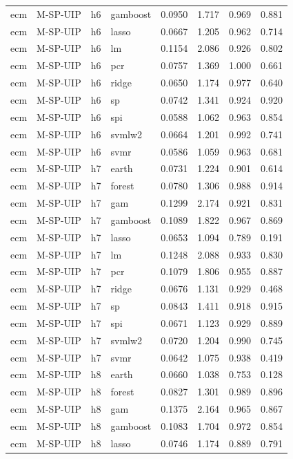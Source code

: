 \begin{ThreePartTable}
\begin{longtable}[t]{llclcccc}
ecm & M-SP-UIP & h6 & gamboost & 0.0950 & 1.717 & 0.969 & 0.881\\
ecm & M-SP-UIP & h6 & lasso & 0.0667 & 1.205 & 0.962 & 0.714\\
ecm & M-SP-UIP & h6 & lm & 0.1154 & 2.086 & 0.926 & 0.802\\
ecm & M-SP-UIP & h6 & pcr & 0.0757 & 1.369 & 1.000 & 0.661\\
ecm & M-SP-UIP & h6 & ridge & 0.0650 & 1.174 & 0.977 & 0.640\\
ecm & M-SP-UIP & h6 & sp & 0.0742 & 1.341 & 0.924 & 0.920\\
ecm & M-SP-UIP & h6 & spi & 0.0588 & 1.062 & 0.963 & 0.854\\
ecm & M-SP-UIP & h6 & svmlw2 & 0.0664 & 1.201 & 0.992 & 0.741\\
ecm & M-SP-UIP & h6 & svmr & 0.0586 & 1.059 & 0.963 & 0.681\\
\addlinespace
ecm & M-SP-UIP & h7 & earth & 0.0731 & 1.224 & 0.901 & 0.614\\
ecm & M-SP-UIP & h7 & forest & 0.0780 & 1.306 & 0.988 & 0.914\\
ecm & M-SP-UIP & h7 & gam & 0.1299 & 2.174 & 0.921 & 0.831\\
ecm & M-SP-UIP & h7 & gamboost & 0.1089 & 1.822 & 0.967 & 0.869\\
ecm & M-SP-UIP & h7 & lasso & 0.0653 & 1.094 & 0.789 & 0.191\\
ecm & M-SP-UIP & h7 & lm & 0.1248 & 2.088 & 0.933 & 0.830\\
ecm & M-SP-UIP & h7 & pcr & 0.1079 & 1.806 & 0.955 & 0.887\\
ecm & M-SP-UIP & h7 & ridge & 0.0676 & 1.131 & 0.929 & 0.468\\
ecm & M-SP-UIP & h7 & sp & 0.0843 & 1.411 & 0.918 & 0.915\\
ecm & M-SP-UIP & h7 & spi & 0.0671 & 1.123 & 0.929 & 0.889\\
ecm & M-SP-UIP & h7 & svmlw2 & 0.0720 & 1.204 & 0.990 & 0.745\\
ecm & M-SP-UIP & h7 & svmr & 0.0642 & 1.075 & 0.938 & 0.419\\
\addlinespace
ecm & M-SP-UIP & h8 & earth & 0.0660 & 1.038 & 0.753 & 0.128\\
ecm & M-SP-UIP & h8 & forest & 0.0827 & 1.301 & 0.989 & 0.896\\
ecm & M-SP-UIP & h8 & gam & 0.1375 & 2.164 & 0.965 & 0.867\\
ecm & M-SP-UIP & h8 & gamboost & 0.1083 & 1.704 & 0.972 & 0.854\\
ecm & M-SP-UIP & h8 & lasso & 0.0746 & 1.174 & 0.889 & 0.791\\

\end{longtable}
\end{ThreePartTable}
